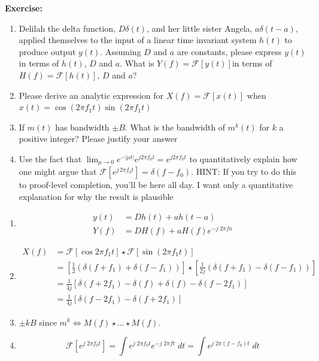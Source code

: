 \documentclass[12pt]{article}
\newcommand{\abs}[1]{\left\vert #1 \right\vert}
\newcommand{\F}{\mathcal{F}}
\newenvironment*{exercise}[1][red]{
    \begin{tcolorbox}[
        parbox=false,
        colback=#1!5!white,
        colframe=#1!75!black,
        breakable
    ]}
    {\end{tcolorbox}}
\begin{document}
\begin{exercise}
    \textbf{Exercise:} 
    \begin{enumerate}
        \item Delilah the delta function, $D \delta (t)$, and her little sister Angela, $a \delta (t -a)$, applied themselves to the input of a linear time invariant system $h(t)$ to produce output $y(t)$. Assuming $D$ and $a$ are constants, please express $y(t)$ in terms of $h(t)$, $D$ and $a$. What is $Y (f) = \F[y(t)]$in terms of $H(f) = \F[h(t)]$, $D$ and $a$?

        \item Please derive an analytic expression for $X(f) = \F[x(t)]$ when $x(t) =
        \cos(2\pi f_1 t) \sin(2\pi f_1 t)$

        \item If $m(t)$ has bandwidth $\pm B$. What is the bandwidth of $m^k(t)$ for $k$ a positive integer? Please justify your answer

        \item Use the fact that $\lim_{\mu \to 0} e^{-\abs{\mu t}} e^{j 2\pi f_0 t} = e^{j 2\pi f_0 t}$ to quantitatively explain how one might argue that $\F[e^{j\, 2\pi f_0 t}] =  \delta (f -f_0).$
        HINT: If you try to do this to proof-level completion, you’ll be here all day. I want only a quantitative explanation for why the result is plausible
    \end{enumerate}
\end{exercise}

\begin{enumerate}
    \item \begin{align*}
        y(t) &= D h(t) + ah(t - a)\\
        Y(f) &= DH(f) + aH(f)e^{-j\; 2\pi fa}
    \end{align*}

    \item \begin{align*}
        X(f) &= \F[\cos 2\pi f_1 t] \star \F[\sin(2\pi f_1 t)]\\
            &= [\frac{1}{2}(\delta(f + f_1) + \delta(f - f_1))] \star [\frac{1}{2j}(\delta(f + f_1) - \delta(f - f_1))]\\ 
            &= \frac{1}{4j}[\delta(f + 2f_1) - \delta(f) + \delta(f) - \delta(f - 2f_1)]\\ 
            &= \frac{1}{4j}[\delta(f - 2f_1) - \delta(f + 2f_1)]
    \end{align*}

    \item $\pm kB$ since $m^k \iff M(f) \star \dots \star M(f)$.
    
    \item \[\F[e^{j\; 2\pi f_0t}] = \int e^{j\; 2\pi f_0t} e^{-j\; 2\pi ft}\; dt = \int e^{j\; 2\pi (f - f_0) t}\; dt\]
\end{enumerate}
\end{document}
